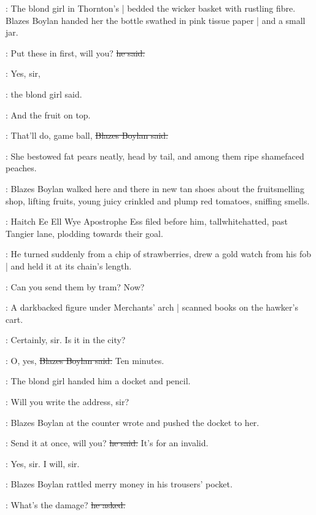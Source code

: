 :
The blond girl in Thornton's |
bedded the wicker basket with rustling fibre.%
Blazes Boylan handed her the bottle swathed in pink tissue paper |
and a small jar.

\boylan:
Put these in first, will you?
\sout{he said.}

\blondgirl:
Yes, sir,

:
the blond girl said.

\blondgirl:
And the fruit on top.

\boylan:
That'll do, game ball,
\sout{Blazes Boylan said.}

:
She bestowed fat pears neatly,
head by tail,
and among them ripe shamefaced peaches.

:
Blazes Boylan walked here and there in new tan shoes
about the fruit\-smell\-ing shop,
lifting fruits,
young juicy crinkled and plump red tomatoes,
sniffing smells.

\begin{interject}
    :
    Haitch Ee Ell Wye Apostrophe Ess \stage{[H.E.L.Y.'S]}
    filed before him, tall\-white\-hatted,
    past Tangier lane,
    plodding towards their goal.
\end{interject}%

:
He turned suddenly from a chip of strawberries,
drew a gold watch from his fob |
and held it at its chain's length.

\boylan:
Can you send them by tram? Now?

\begin{interject}
    :
    A darkbacked figure under Merchants' arch |
    scanned books on the hawker's cart.
\end{interject}

\blondgirl:
Certainly, sir.
Is it in the city?

\boylan:
O, yes,
\sout{Blazes Boylan said.}
Ten minutes.

:
The blond girl handed him a docket and pencil.

\blondgirl:
Will you write the address,%
sir?

:
Blazes Boylan at the counter wrote
and pushed the docket to her.

\boylan:
Send it at once, will you?
\sout{he said.}
It's for an invalid.

\blondgirl:
Yes, sir. I will, sir.

:
Blazes Boylan rattled merry money in his trousers' pocket.

\boylan:
What's the damage?
\sout{he asked.}

